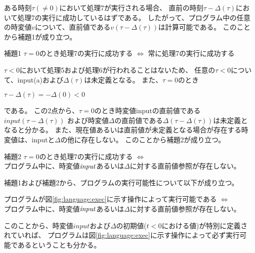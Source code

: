 ある時刻$\tau(\neq 0)$において処理7が実行される場合、
直前の時刻$\tau - \Delta(\tau)$において処理7の実行に成功しているはずである。
したがって、プログラム中の任意の時変値$v$について、直前値である$v(\tau - \Delta(\tau))$は計算可能である。
このことから補題1が成り立つ。
\begin{itembox}[l]{補題1}
  $\tau = 0$のとき処理7の実行に成功する $\Longleftrightarrow$ 常に処理7の実行に成功する
\end{itembox}

$\tau < 0$において処理5および処理6が行われることはないため、
任意の$\tau < 0$について、input(a)および$\Delta(\tau)$は未定義となる。
また、$\tau = 0$のとき
\begin{center}
  $\tau - \Delta(\tau) = -\Delta(0) < 0$
\end{center}
である。
この2点から、$\tau = 0$のとき時変値inputの直前値である$input(\tau - \Delta(\tau))$
および時変値$\Delta$の直前値である$\Delta(\tau - \Delta(\tau))$は未定義となると分かる。
また、現在値あるいは直前値が未定義となる場合が存在する時変値は、inputと$\Delta$の他に存在しない。
このことから補題2が成り立つ。
\begin{itembox}[l]{補題2}
  $\tau = 0$のとき処理7の実行に成功する $\Longleftrightarrow$ \\
  プログラム中に、時変値${\it input}$あるいは$\Delta$に対する直前値参照が存在しない。
\end{itembox}

補題1および補題2から、プログラムの実行可能性について以下が成り立つ。
\begin{screen}
  プログラムが図\ref{fig:language:exec}に示す操作によって実行可能である $\Longleftrightarrow$ \\
  プログラム中に、時変値${\it input}$あるいは$\Delta$に対する直前値参照が存在しない。
\end{screen}

このことから、時変値$input$および$\Delta$の初期値($t < 0$における値)が特別に定義されていれば、
プログラムは図\ref{fig:language:exec}に示す操作によって必ず実行可能であるということも分かる。
